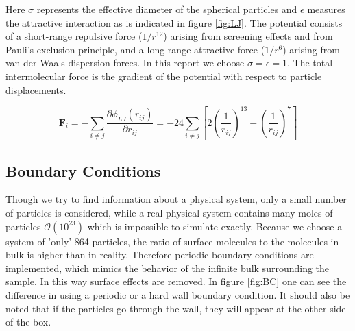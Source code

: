 \documentclass{article}
\begin{document}
Here $\sigma$ represents the effective diameter of the spherical particles and $\epsilon$ measures the attractive interaction as is indicated in figure \ref{fig:LJ}. The potential consists of a short-range repulsive force ($1/r^{12}$) arising from screening effects and from Pauli's exclusion principle, and a long-range attractive force ($1/r^6$) arising from van der Waals dispersion forces. In this report we choose $\sigma=\epsilon=1$. The total intermolecular force is the gradient of the potential with respect to particle displacements.

\begin{equation}
\label{forcegrad}
 \mathbf{F}_i=-\sum_{i\neq j} \frac{\partial \phi_{LJ}(r_{ij})}{\partial r_{ij}}=-24 \sum_{i\neq j}  \left[ 2 \left(  \frac{1}{r_{ij}}\right)^{13} - \left(  \frac{1}{r_{ij}}\right)^{7} \right]
\end{equation}

\subsection{Boundary Conditions}
Though we try to find information about a physical system, only a small number of particles is considered, while a real physical system contains many moles of particles $\mathcal{O}(10^{23})$ which is impossible to simulate exactly. Because we choose a system of 'only' 864 particles, the ratio of surface molecules to the molecules in bulk is higher than in reality. Therefore periodic boundary conditions are implemented, which mimics the behavior of the infinite bulk surrounding the sample. In this way surface effects are removed. In figure \ref{fig:BC} one can see the difference in using a periodic or a hard wall boundary condition. It should also be noted that if the particles go through the wall, they will appear at the other side of the box.
\end{document}
